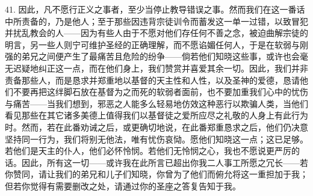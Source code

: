 41. 因此，凡不愿行正义之事者，至少当停止教导错误之事。然而我们在这一番话中所责备的，乃是他人；至于那些因违背宗徒训令而蓄发这一单一过错，以致冒犯并扰乱教会的人——因为有些人由于不愿对他们存任何不善之念，被迫曲解宗徒的明言，另一些人则宁可维护圣经的正确理解，而不愿谄媚任何人，于是在软弱与刚强的弟兄之间便产生了最痛苦且危险的纷争——倘若他们知晓这些事，或许也会毫无迟疑地纠正这一点，而在他们身上，我们赞赏并喜爱其余一切。因此，我们并非责备那些人，而是恳求并郑重地以基督的天主性和人性，以及圣神的爱德，恳请他们不要再把这绊脚石放在基督为之而死的软弱者面前，也不要加重我们心中的忧伤与痛苦——当我们想到，邪恶之人能多么轻易地仿效这种恶行以欺骗人类，当他们看见那些在其它诸多美德上值得我们以基督徒之爱所应尽之礼敬的人身上有此行为时。然而，若在此番劝诫之后，或更确切地说，在此番郑重恳求之后，他们仍决意坚持同一行为，我们将别无他法，唯有忧伤哀恸。愿他们知晓这一点；这已足够。若他们是天主的仆人，他们必怀怜悯。若他们无怜悯之心，我也不愿说更严厉的话。因此，所有这一切——或许我在此所言已超出你我二人事工所愿之冗长——若你赞同，请让我们的弟兄和儿子们知晓，你曾为了他们而俯允将这一重担加于我；但若你觉得有需要删改之处，请通过你的圣座之答复告知于我。\par

